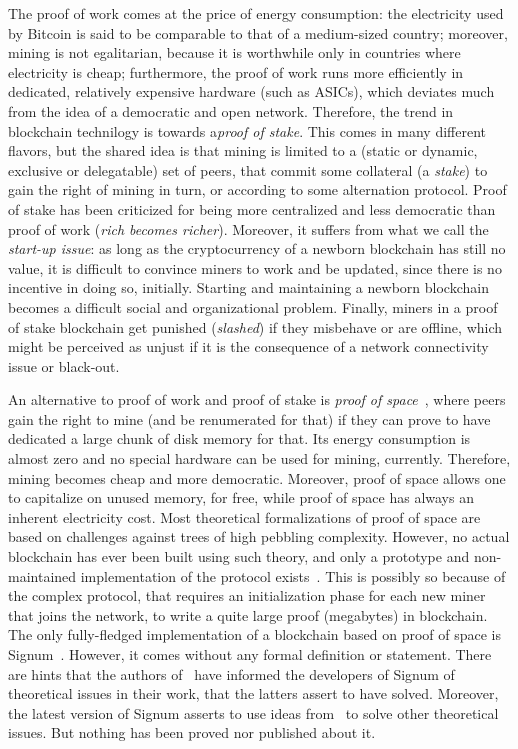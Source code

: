 The proof of work comes at the price of energy consumption:
the electricity used by Bitcoin is said
to be comparable to that of a medium-sized country; moreover, mining is not egalitarian, because
it is worthwhile only in countries where electricity is cheap; furthermore, the proof of work
runs more efficiently in dedicated, relatively expensive hardware (such as ASICs),
which deviates much from the idea of a democratic and open network.
Therefore, the trend in blockchain technilogy is towards a\emph{proof of stake}.
This comes in many different flavors, but
the shared idea is that mining is limited to a (static or dynamic, exclusive or delegatable)
set of peers, that commit some collateral (a \emph{stake}) to gain the right of mining
in turn, or according to some alternation protocol.
Proof of stake has been criticized for being more centralized and less democratic than proof of work
(\emph{rich becomes richer}).
Moreover, it suffers from what we call the \emph{start-up issue}: as long as the cryptocurrency
of a newborn blockchain has still no value, it is difficult to convince miners to work and
be updated, since there is no incentive in doing so, initially. Starting and maintaining
a newborn blockchain becomes a difficult social and organizational problem. Finally, miners in
a proof of stake blockchain get punished (\emph{slashed}) if they misbehave or are offline, which
might be perceived as unjust if it is the consequence of a network connectivity issue or black-out.

An alternative to proof of work and proof of stake is
\emph{proof of space}~\cite{AtenieseBFG14,DziembowskiFKP15}, where
peers gain the right to mine (and
be renumerated for that) if they can prove to have dedicated a large chunk of disk memory for that.
Its energy consumption is almost zero and no special
hardware can be used for mining, currently. Therefore, mining becomes cheap
and more democratic. Moreover, proof of space allows
one to capitalize on unused memory, for free, while proof of space has always an
inherent electricity cost. Most theoretical formalizations of proof of space are
based on challenges against trees of high pebbling complexity. However, no actual blockchain
has ever been built using such theory, and only a prototype and non-maintained
implementation of the protocol exists~\cite{ParkKFGAP18}. This is possibly so because of the
complex protocol, that requires an initialization phase for each new miner that joins the network,
to write a quite large proof (megabytes) in blockchain. The only fully-fledged implementation
of a blockchain based on proof of space is Signum~\cite{Signum}. However, it comes without
any formal definition or statement.
There are hints that the authors of~\cite{ParkKFGAP18} have informed the developers of Signum of
theoretical issues in their work, that the latters assert to have solved.
Moreover, the latest version of Signum asserts to use ideas from~\cite{ParkKFGAP18} to solve
other theoretical issues. But nothing has been proved nor published about it.
